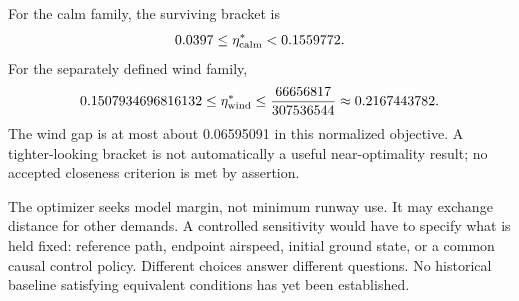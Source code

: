For the calm family, the surviving bracket is
\[
0.0397\leq\eta^*_{\rm calm}<0.1559772.
\]
For the separately defined wind family,
\[
0.1507934696816132\leq\eta^*_{\rm wind}
\leq\frac{66656817}{307536544}\approx0.2167443782.
\]
The wind gap is at most about 0.06595091 in this normalized objective. A tighter-looking bracket is not automatically a useful near-optimality result; no accepted closeness criterion is met by assertion.

The optimizer seeks model margin, not minimum runway use. It may exchange distance for other demands. A controlled sensitivity would have to specify what is held fixed: reference path, endpoint airspeed, initial ground state, or a common causal control policy. Different choices answer different questions. No historical baseline satisfying equivalent conditions has yet been established.
\par\medskip
